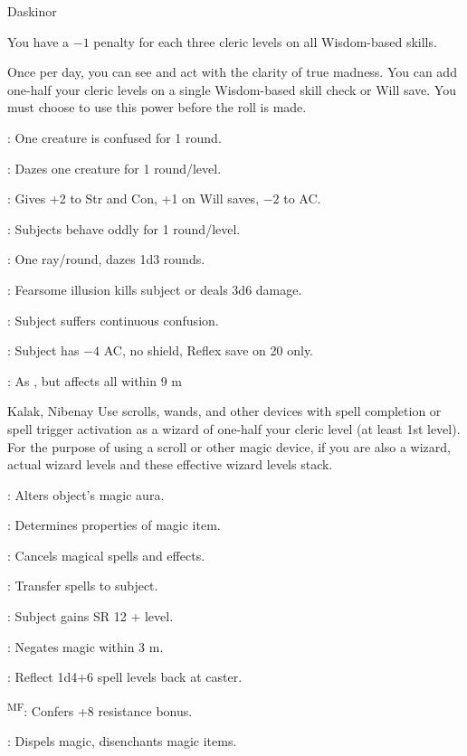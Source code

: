 {Daskinor}
{You have a $-1$ penalty for each three cleric levels on all Wisdom-based skills.

Once per day, you can see and act with the clarity of true madness. You can add one-half your cleric levels on a single Wisdom-based skill check or Will save. You must choose to use this power before the roll is made.}
{
	\item {}: One creature is confused for 1 round.
	\item {}: Dazes one creature for 1 round/level.
	\item {}: Gives +2 to Str and Con, +1 on Will saves, $-2$ to AC.
	\item {}: Subjects behave oddly for 1 round/level.
	\item {}: One ray/round, dazes 1d3 rounds.
	\item {}: Fearsome illusion kills subject or deals 3d6 damage.
	\item {}: Subject suffers continuous confusion.
	\item {}: Subject has $-4$ AC, no shield, Reflex save on 20 only.
	\item {}: As , but affects all within 9 m
}

{Kalak, Nibenay}
{Use scrolls, wands, and other devices with spell completion or spell trigger activation as a wizard of one-half your cleric level (at least 1st level). For the purpose of using a scroll or other magic device, if you are also a wizard, actual wizard levels and these effective wizard levels stack.}
{
	\item {}: Alters object's magic aura.
	\item {}: Determines properties of magic item.
	\item {}: Cancels magical spells and effects.
	\item {}: Transfer spells to subject.
	\item {}: Subject gains SR 12 + level.
	\item {}: Negates magic within 3 m.
	\item {}: Reflect 1d4+6 spell levels back at caster.
	\item {}\textsuperscript{M}\textsuperscript{F}: Confers +8 resistance bonus.
	\item {}: Dispels magic, disenchants magic items.
}

